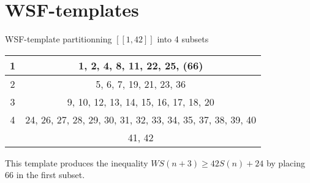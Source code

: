 \documentclass{article}
\newtheorem{computational theorem}{Computational Theorem}[section]
\begin{document}
\begin{center}
\begin{tabular}{|*{2}{c|}}
\end{tabular}
\end{center}
\section{WSF-templates}
\begin{center}
WSF-template partitionning \([\![1, 42]\!]\) into 4 subsets
\begin{tabular}{|*{2}{c|}}
	\hline
	1 & 1, 2, 4, 8, 11, 22, 25, \textbf{(66)}\\
	\hline
	2 & 5, 6, 7, 19, 21, 23, 36\\
	\hline
	3 & 9, 10, 12, 13, 14, 15, 16, 17, 18, 20\\
	\hline
	4 & 24, 26, 27, 28, 29, 30, 31, 32, 33, 34, 35, 37, 38, 39, 40\\
	& 41, 42\\
	\hline
\end{tabular}
\end{center}
This template produces the inequality \(WS(n+3) \geqslant 42S(n) + 24\)
by placing 66 in the first subset.
\end{document}
